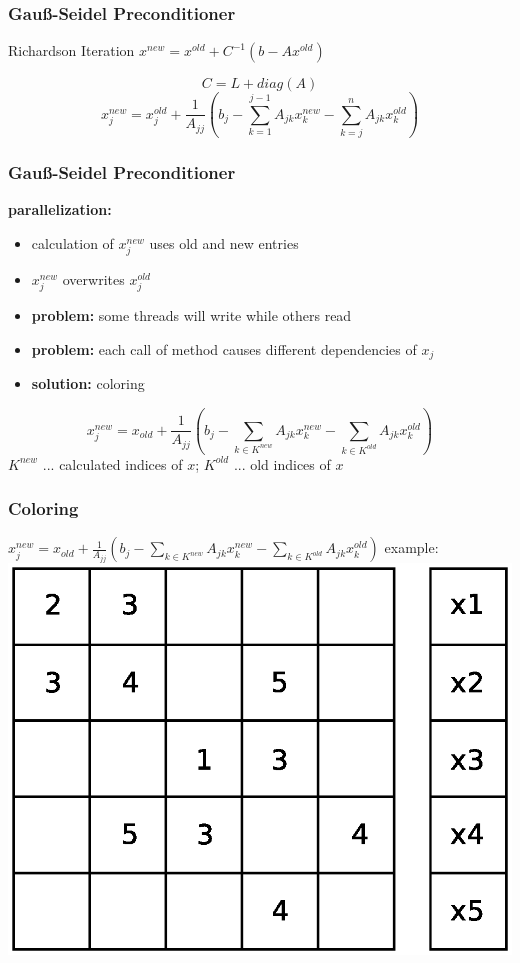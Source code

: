 \documentclass{beamer}
\begin{document}
\begin{frame}
\frametitle{Gau\ss-Seidel Preconditioner}
\begin{block}{Richardson Iteration}
$x^{new} = x^{old} + C^{-1} (b - Ax^{old})$
\end{block}
$$C = L + diag(A)$$
$$x_j^{new} = x_j^{old} + \frac{1}{A_{jj}} \left(b_{j} - \sum_{k=1}^{j-1} A_{jk}
x_k^{new} - \sum_{k=j}^{n} A_{jk} x_k^{old}\right)$$

\end{frame}

\begin{frame}
\frametitle{Gau\ss-Seidel Preconditioner}

\textbf{parallelization:}
\begin{itemize}
\item calculation of $x_j^{new}$ uses old and new entries
\item $x_j^{new}$ overwrites $x_j^{old}$
\item \textbf{problem:} some threads will write while others read
\item \textbf{problem:} each call of method causes different dependencies of $x_j$
\item \textbf{solution:}
coloring
\end{itemize}


$$ x_j^{new} = x_{old} + \frac{1}{A_{jj}} \left(b_{j} - \sum_{k \in K^{new}}A_{jk}
 x_k^{new} - \sum_{k \in K^{old}}A_{jk} x_k^{old}\right)$$
$K^{new}$ ... calculated indices of $x$;
$K^{old}$ ... old indices of $x$
\end{frame}

\begin{frame}
\frametitle{Coloring}
$ x_j^{new} = x_{old} + \frac{1}{A_{jj}} \left(b_{j} - \sum_{k \in K^{new}}A_{jk}
 x_k^{new} - \sum_{k \in K^{old}}A_{jk} x_k^{old}\right)$
example:
\includegraphics[width=0.8\linewidth]{graphic/coloringGS1.eps}
\end{frame}
\end{document}
